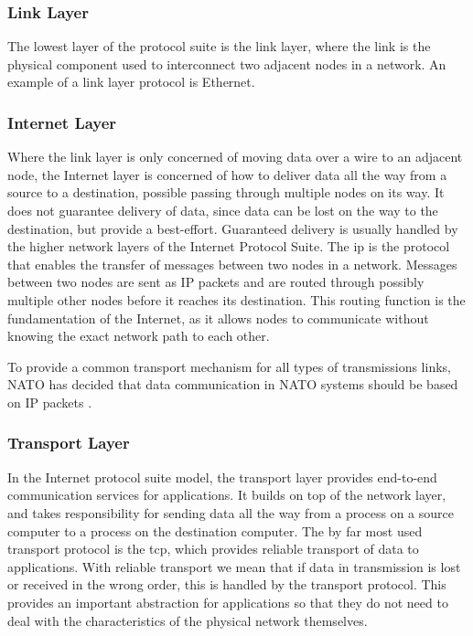 \subsubsection{Link Layer}

The lowest layer of the protocol suite is the link layer, where the link is the
physical component used to interconnect two adjacent nodes in a network. An
example of a link layer protocol is Ethernet.

\subsubsection{Internet Layer}

 Where the link layer is only concerned of moving data over a wire to an
 adjacent node, the Internet layer is concerned of how to deliver data all the
 way from a source to a destination, possible passing through multiple nodes on
 its way. It does not guarantee delivery of data, since data can be lost on the
 way to the destination, but provide a best-effort. Guaranteed delivery is
 usually handled by the higher network layers of the Internet Protocol Suite.
 The \gls{ip} is the protocol that enables the transfer of messages between two
 nodes in a network. Messages between two nodes are sent as IP packets and are
 routed through possibly multiple other nodes before it reaches its destination.
 This routing function is the fundamentation of the Internet, as it allows nodes
 to communicate without knowing the exact network path to each other.

To provide a
common transport mechanism for all types of transmissions links, NATO has
decided that data communication in NATO systems should be based on IP packets
\cite{nnec-study}.


 \subsubsection{Transport Layer}

In the Internet protocol suite model, the transport layer provides end-to-end
communication services for applications. It builds on top of the network layer,
and takes responsibility for sending data all the way from a process on a source
computer to a process on the destination computer. The by far most used
transport protocol is the \gls{tcp}, which provides reliable transport of data
to applications. With reliable transport we mean that if data in transmission is
lost or received in the wrong order, this is handled by the transport protocol.
This provides an important abstraction for applications so that they do not need
to deal with the characteristics of the physical network themselves.

